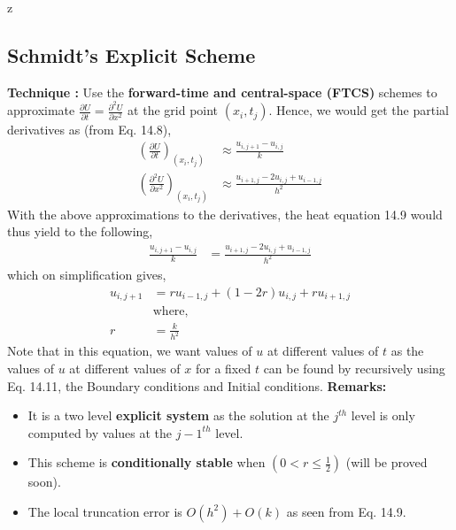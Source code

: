 z\documentclass[a4paper,12pt,twoside]{book}
\newcommand{\nll}[0]{\newline\newline}
\newcommand{\pder}[2]{\frac{\partial #1}{\partial #2}}
\begin{document}
\subsection{Schmidt's Explicit Scheme}
\textbf{Technique : }Use the \textbf{forward-time and central-space (FTCS)} schemes to approximate $\pder{U}{t} = \pder{^2U}{x^2}$ at the grid point $(x_i,t_j)$.
\nll
Hence, we would get the partial derivatives as (from Eq. 14.8),
\begin{equation}
    \begin{split}
        \left(\pder{U}{t}\right)_{(x_i,t_j)} &\approx \frac{u_{i,j+1} - u_{i,j}}{k} \\
        \left( \pder{^2 U}{x^2} \right)_{(x_i,t_j)} &\approx \frac{u_{i+1,j} - 2u_{i,j} + u_{i-1,j}}{h^2}
    \end{split}
\end{equation}
With the above approximations to the derivatives, the heat equation 14.9 would thus yield to the following,
\begin{equation*}
    \begin{split}
        \frac{u_{i,j+1} - u_{i,j}}{k} &= \frac{u_{i+1,j} - 2u_{i,j} + u_{i-1,j}}{h^2}
    \end{split}
\end{equation*}
which on simplification gives,
\begin{equation}
    \begin{split}
        u_{i,j+1} &= ru_{i-1,j} + (1-2r)u_{i,j} + ru_{i+1,j}\\
        &\text{where,}\\
        r &= \frac{k}{h^2}
    \end{split}
\end{equation}
Note that in this equation, we want values of $u$ at different values of $t$ as the values of $u$ at different values of $x$ for a fixed $t$ can be found by recursively using Eq. 14.11, the Boundary conditions and Initial conditions.
\nll
\textbf{Remarks:}
\begin{itemize}
    \item {It is a two level \textbf{explicit system} as the solution at the $j^{th}$ level is only computed by values at the $j-1^{th}$ level.}
    \item{This scheme is \textbf{conditionally stable} when $\left( 0 < r \le \frac{1}{2} \right)$ (will be proved soon).}
    \item{The local truncation error is $O(h^2) + O(k)$ as seen from Eq. 14.9.}
\end{itemize}
\end{document}
